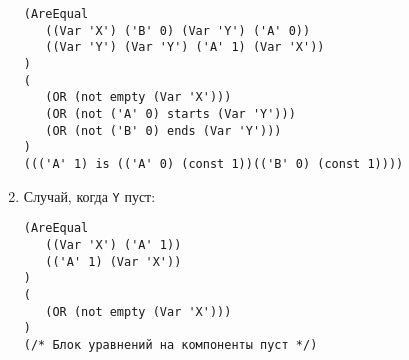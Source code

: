 \documentclass[12pt]{article}
\begin{document}
\begin{enumerate}
\begin{verbatim}
(AreEqual 
   ((Var 'X') ('B' 0) (Var 'Y') ('A' 0))
   ((Var 'Y') (Var 'Y') ('A' 1) (Var 'X'))
)
(
   (OR (not empty (Var 'X')))
   (OR (not ('A' 0) starts (Var 'Y')))
   (OR (not ('B' 0) ends (Var 'Y')))
)
((('A' 1) is (('A' 0) (const 1))(('B' 0) (const 1))))
\end{verbatim}

\item Случай, когда \verb|Y| пуст:

\begin{verbatim}
(AreEqual 
   ((Var 'X') ('A' 1))
   (('A' 1) (Var 'X'))
)
(
   (OR (not empty (Var 'X')))
)
(/* Блок уравнений на компоненты пуст */)
\end{verbatim}
\end{enumerate}
\end{document}
